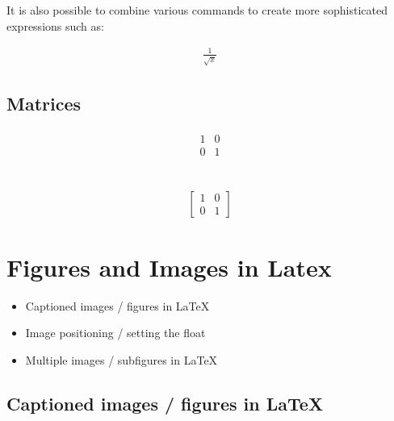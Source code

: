 \documentclass{article}
\begin{document}
 
It is also possible to combine various 
commands to create more sophisticated expressions such as:

\begin{align*}
    \frac{1}{\sqrt{x}}
  \end{align*}

\subsection{Matrices}
\begin{align*}
\begin{matrix}
    1 & 0\\
    0 & 1
\end{matrix}
\end{align*}



\begin{align*}
[
    \begin{matrix}
1 & 0\\
0 & 1
\end{matrix}
]
\end{align*}



\begin{align*}
    \left[
        \begin{matrix}
    1 & 0\\
    0 & 1
    \end{matrix}
    \right]
    \end{align*}
\section{Figures and Images in {\sc Latex}}


\begin{itemize}
    \item Captioned images / figures in LaTeX
    \item Image positioning / setting the float
    \item Multiple images / subfigures in LaTeX

\end{itemize}
\subsection{Captioned images / figures in LaTeX}
\end{document}
